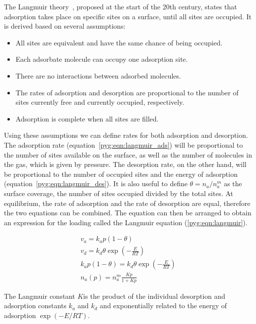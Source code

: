 The Langmuir theory~\cite{langmuirAdsorptionGasesPlane1918a}, 
proposed at the start of the 20th century, states that
adsorption takes place on specific sites on a surface, until 
all sites are occupied. 
It is derived based on several assumptions:

\begin{itemize}
    
    \item All sites are equivalent and have the same chance of being occupied.
    \item Each adsorbate molecule can occupy one adsorption site.
    \item There are no interactions between adsorbed molecules.
    \item The rates of adsorption and desorption are proportional to the number
    of sites currently free and currently occupied, respectively.
    \item Adsorption is complete when all sites are filled.
    
\end{itemize}

Using these assumptions we can define rates for both adsorption and
desorption. The adsorption rate (equation~\ref{pyg:eqn:langmuir_ads}) 
will be proportional to the number of sites available on the surface, 
as well as the number of molecules in the gas, which is given by pressure.
The desorption rate, on the other hand, will be proportional to the 
number of occupied sites and the energy of adsorption (equation~\ref{pyg:eqn:langmuir_des}).
It is also useful to define \(\theta = n_a/n_a^m\) as the surface coverage,
the number of sites occupied divided by the total sites. At equilibrium, 
the rate of adsorption and the rate of
desorption are equal, therefore the two equations can be combined.
The equation can then be arranged to obtain an expression for the 
loading called the Langmuir equation (\ref{pyg:eqn:langmuir}).

\begin{gather}
    v_a = k_a p (1 - \theta) \label{pyg:eqn:langmuir_ads} \\
    v_d = k_d \theta \exp{(-\frac{E}{RT})} \label{pyg:eqn:langmuir_des} \\
    k_a p (1 - \theta) = k_d \theta \exp{(-\frac{E}{RT})} \\
    n_a(p) = n_a^m \frac{Kp}{1+Kp} \label{pyg:eqn:langmuir}
\end{gather}

The Langmuir constant \(K\)is the product of the individual desorption 
and adsorption constants \(k_a\) and \(k_d\) and exponentially 
related to the energy of adsorption \(\exp{(-{E}/{RT})}\).

